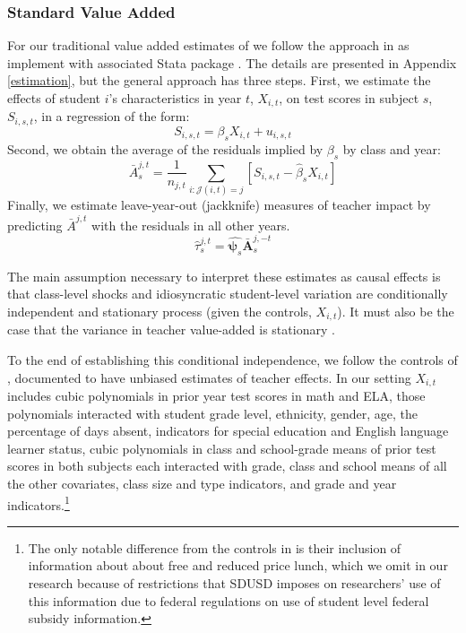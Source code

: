 \documentclass[12pt]{article}
\theoremstyle{definition}
\theoremstyle{definition}
\theoremstyle{definition}
\theoremstyle{definition}
\begin{document}
\subsubsection{Standard Value Added} \label{va_std}

For our traditional value added estimates of we follow the approach in \citet{chetty2014measuring1} as implement with associated Stata package \citep{vam_stata_ado}. The details are presented in Appendix \ref{estimation}, but the general approach has three steps. First, we estimate the effects of student $i$'s characteristics in year $t$, $X_{i,t}$, on test scores in subject $s$, $S_{i,s,t}$, in a regression of the form:
\begin{equation}
S_{i,s,t} =  \beta_s X_{i, t} + u_{i,s,t} \nonumber
\end{equation}
\noindent %
Second, we obtain the average of the residuals implied by $\beta_s$ by class and year:
\begin{equation}
\bar{A}^{j,t}_{s} = \frac{1}{n_{j,t}} \sum_{i:\mathcal{J}(i,t) = j} \left [ S_{i,s,t} - \hat{\beta}_s X_{i, t} \right ] \nonumber
\end{equation}
\noindent Finally, we estimate leave-year-out (jackknife) measures of teacher impact by predicting $\bar{A}^{j,t}$ with the residuals in all other years.
\begin{equation}
\hat{\tau}^{j,t}_s = \hat{\bm{\psi}_s} \bar{\bm{A}}^{j,-t}_s
\end{equation}

The main assumption necessary to interpret these estimates as causal effects is that class-level shocks and idiosyncratic student-level variation are conditionally independent and stationary process (given the controls, $X_{i,t}$). It must also be the case that the variance in teacher value-added is stationary \citep[as outlined in][---again formal details are in Appendix \ref{estimation}]{chetty2014measuring1}.

To the end of establishing this conditional independence, we follow the controls of \citet{chetty2014measuring1}, documented to have unbiased estimates of teacher effects. In our setting $X_{i,t}$ includes cubic polynomials in prior year test scores in math and ELA, those polynomials interacted with student grade level, ethnicity, gender, age, the percentage of days absent, indicators for special education and English language learner status, cubic polynomials in class and school-grade means of prior test scores in both subjects each interacted with grade, class and school means of all the other covariates, class size and type indicators, and grade and year indicators.\footnote{The only notable difference from the controls in \citet{chetty2014measuring1} is their inclusion of information about about free and reduced price lunch, which we omit in our research because of restrictions that SDUSD imposes on researchers' use of this information due to federal regulations on use of student level federal subsidy information.}
\end{document}
